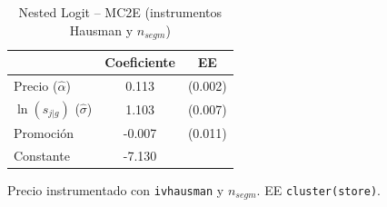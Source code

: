 \begin{table}[H]
\centering
\caption{Nested Logit -- MC2E (instrumentos Hausman y $n_{segm}$)}
\begin{tabular}{lcc}
\toprule
& Coeficiente & EE \\
\midrule
Precio ($\hat{\alpha}$) & 0.113 & (0.002) \\
$\ln(s_{j|g})$ ($\hat{\sigma}$) & 1.103 & (0.007) \\
Promoci\'on & -0.007 & (0.011) \\
Constante & -7.130 & \\
\bottomrule
\end{tabular}

\smallskip
{\footnotesize\begin{minipage}{0.92\linewidth}Precio instrumentado con \texttt{ivhausman} y $n_{segm}$. EE \texttt{cluster(store)}.\end{minipage}}
\end{table}
